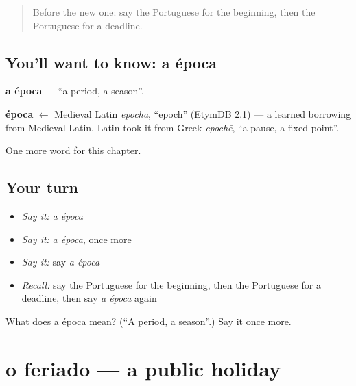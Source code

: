 \label{lesson:PT-C212-epoca}



\begin{quote}
Before the new one: say the Portuguese for the beginning, then the Portuguese for a deadline.
\end{quote}

\subsection*{You'll want to know: a época}
\textbf{a época} — \textquotedblleft{}a period, a season\textquotedblright{}.

\begin{cousinweb}
\textbf{época} $\leftarrow$ Medieval Latin \emph{epocha}, \textquotedblleft{}epoch\textquotedblright{} (EtymDB 2.1) — a learned borrowing from Medieval Latin. Latin took it from Greek \emph{epochē}, \textquotedblleft{}a pause, a fixed point\textquotedblright{}.
\end{cousinweb}

\begin{grammarlens}[title={What you've built}]
One more word for this chapter.
\end{grammarlens}

\subsection*{Your turn}
\begin{itemize}
\raggedright
  \item \emph{Say it:} \emph{a época}
  \item \emph{Say it:} \emph{a época}, once more
  \item \emph{Say it:} say \emph{a época}
  \item \emph{Recall:} say the Portuguese for the beginning, then the Portuguese for a deadline, then say \emph{a época} again
\end{itemize}

\begin{tcolorbox}[breakable,colback=teal!4,colframe=teal!35!black,title={Before you move on}]
What does a época mean? (\textquotedblleft{}A period, a season\textquotedblright{}.) Say it once more.
\end{tcolorbox}
\section[o feriado]{o feriado — a public holiday}

